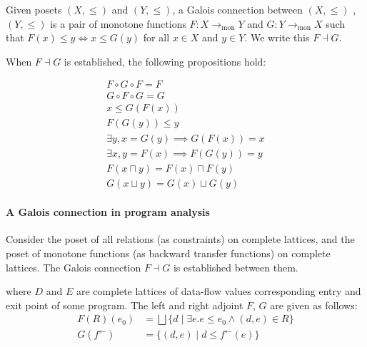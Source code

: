 \documentclass{llncs}
\newcommand{\Pow}{\mathcal{P}}
\newcommand{\Rel}{\mathrm{Rel}}
\newcommand{\Unidir}{\mathrm{Bwd}}
\newcommand{\tomon}{\to_{\mathrm{mon}}}
\newcommand{\fb}{{f^{\leftarrow}}}
\newcommand{\join}{\sqcup}
\newcommand{\bigjoin}{\bigsqcup}
\newcommand{\meet}{\sqcap}
\newcommand{\comp}{\circ}
\begin{document}
  \begin{definition}
    Given posets $(X, \leq)$ and $(Y, \leq)$, a Galois connection between $(X, \leq)$ , $(Y, \leq)$ is a pair of monotone functions $F : X \tomon Y$ and $G : Y \tomon X$ such that $F(x) \leq y \iff x \leq G(y)$ for all $x \in X$ and $y \in Y$.
    We write this $F \dashv G$.
  \end{definition}

  When $F \dashv G$ is established, the following propositions hold:

  \begin{align}
    F \comp G \comp F = F \\
    G \comp F \comp G = G \\
    x \leq G(F(x)) \\
    F(G(y)) \leq y \\
    \exists y, x = G(y) \implies G(F(x)) = x \\
    \exists x, y = F(x) \implies F(G(y)) = y \\
    F (x \meet y) = F(x) \meet F(y) \\
    G (x \join y) = G(x) \join G (y)
  \end{align}

 \paragraph{A Galois connection in program analysis}

    Consider the poset of all relations (as constraints) on complete lattices, and the poset of monotone functions (as backward transfer functions) on complete lattices.
    The Galois connection $F \dashv G$ is established between them.
  \begin{center}
  \end{center}
  where $D$ and $E$ are complete lattices of data-flow values corresponding entry and exit point of some program. The left and right adjoint $F$, $G$ are given as follows:
  \begin{align*}
    F (R)(e_{0}) &= \bigjoin \{ d \mid \exists e. e \leq e_{0}  \land (d , e) \in R \} \\
    G (\fb) &= \{ (d , e) \mid d \leq \fb(e) \} \\
  \end{align*}
\end{document}
